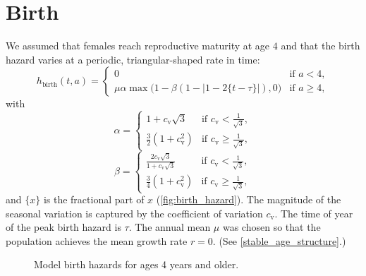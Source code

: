 \documentclass[12pt]{article}
\begin{document}
\section{Birth}

We assumed that females reach reproductive maturity at age $4$ and
that the birth hazard varies at a periodic, triangular-shaped rate in
time:
\begin{equation}
  h_{\text{birth}}(t, a) =
  \begin{cases}
    0 & \text{if $a < 4$},
    \\
    \mu \alpha \max\big(1 - \beta (1 - |1 - 2 \{t - \tau\}|), 0\big)
    & \text{if $a \geq 4$},
  \end{cases}
\end{equation}
with
\begin{equation}
  \alpha =
  \begin{cases}
    1 + c_{\text{v}} \sqrt{3}
    & \text{if $c_{\text{v}} < \frac{1}{\sqrt{3}}$},
    \\
    \frac{3}{2} \left(1 + c_{\text{v}}^2\right)
    & \text{if $c_{\text{v}} \geq \frac{1}{\sqrt{3}}$},
  \end{cases}
\end{equation}
\begin{equation}
  \beta =
  \begin{cases}
    \frac{2 c_{\text{v}} \sqrt{3}}{1 + c_{\text{v}} \sqrt{3}}
    & \text{if $c_{\text{v}} < \frac{1}{\sqrt{3}}$},
    \\
    \frac{3}{4} \left(1 + c_{\text{v}}^2\right)
    & \text{if $c_{\text{v}} \geq \frac{1}{\sqrt{3}}$},
  \end{cases}
\end{equation}
and $\{x\}$ is the fractional part of $x$
(\autoref{fig:birth_hazard}).  The magnitude of the seasonal variation
is captured by the coefficient of variation $c_{\text{v}}$.  The time of year
of the peak birth hazard is $\tau$.  The annual mean $\mu$ was chosen
so that the population achieves the mean growth rate $r = 0$.  (See
\autoref{stable_age_structure}.)

\begin{figure}
  \centering
  
  \caption{Model birth hazards for ages 4 years and older.}
  \label{fig:birth_hazard}
\end{figure}
\end{document}
